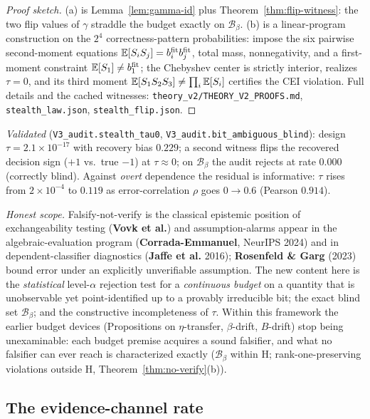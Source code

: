 \begin{proof}[Proof sketch]
(a) is Lemma~\ref{lem:gamma-id} plus Theorem~\ref{thm:flip-witness}: the two flip values
of $\gamma$ straddle the budget exactly on $\mathcal B_\beta$. (b) is a linear-program
construction on the $2^4$ correctness-pattern probabilities: impose the six pairwise
second-moment equations $\mathbb{E}[S_iS_j]=b^{\mathrm{fit}}_ib^{\mathrm{fit}}_j$, total mass,
nonnegativity, and a first-moment constraint $\mathbb{E}[S_1]\neq b^{\mathrm{fit}}_1$; the
Chebyshev center is strictly interior, realizes $\tau=0$, and its third moment
$\mathbb{E}[S_1S_2S_3]\neq\prod_i\mathbb{E}[S_i]$ certifies the CEI violation. Full details and the
cached witnesses: \texttt{theory\_v2/THEORY\_V2\_PROOFS.md},
\texttt{stealth\_law.json}, \texttt{stealth\_flip.json}.
\end{proof}

\noindent\emph{Validated} (\texttt{V3\_audit.stealth\_tau0},
\texttt{V3\_audit.bit\_ambiguous\_blind}): design $\tau=2.1\times10^{-17}$ with recovery
bias $0.229$; a second witness flips the recovered decision sign ($+1$ vs.\ true $-1$)
at $\tau\approx0$; on $\mathcal B_\beta$ the audit rejects at rate $0.000$ (correctly
blind). Against \emph{overt} dependence the residual is informative: $\tau$ rises from
$2\times10^{-4}$ to $0.119$ as error-correlation $\rho$ goes $0\to0.6$ (Pearson
$0.914$).

\smallskip\noindent\emph{Honest scope.} Falsify-not-verify is the classical epistemic
position of exchangeability testing (\textbf{Vovk et al.}) and assumption-alarms appear
in the algebraic-evaluation program (\textbf{Corrada-Emmanuel}, NeurIPS 2024) and in
dependent-classifier diagnostics (\textbf{Jaffe et al.} 2016); \textbf{Rosenfeld \&
Garg} (2023) bound error under an explicitly unverifiable assumption. The new content
here is the \emph{statistical} level-$\alpha$ rejection test for a \emph{continuous
budget} on a quantity that is unobservable yet point-identified up to a provably
irreducible bit; the exact blind set $\mathcal B_\beta$; and the constructive
incompleteness of $\tau$. Within this framework the earlier budget devices
(Propositions on $\eta$-transfer, $\beta$-drift, $B$-drift) stop being unexaminable:
each budget premise acquires a sound falsifier, and what no falsifier can ever reach is
characterized exactly ($\mathcal B_\beta$ within H; rank-one-preserving violations
outside H, Theorem~\ref{thm:no-verify}(b)).

\subsection{The evidence-channel rate}\label{sec:evrate}


